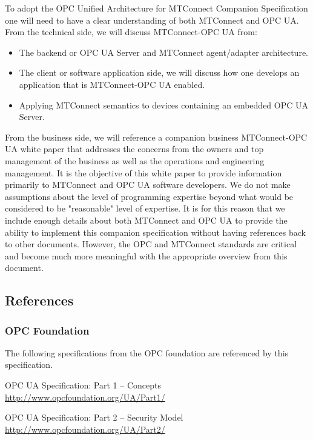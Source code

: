 \documentclass{mtconnect}	%
\begin{document}
To adopt the OPC Unified Architecture for MTConnect Companion Specification one will need to have a clear understanding of both MTConnect and OPC UA. From the technical side, we will discuss MTConnect-OPC UA from:

\begin{itemize}
    \item The backend or OPC UA Server and MTConnect agent/adapter architecture.
    \item The client or software application side, we will discuss how one develops an application that is MTConnect-OPC UA enabled.
    \item Applying MTConnect semantics to devices containing an embedded OPC UA Server.
\end{itemize}

From the business side, we will reference a companion business MTConnect-OPC UA white paper that addresses the concerns from the owners and top management of the business as well as the operations and engineering management. It is the objective of this white paper to provide information primarily to MTConnect and OPC UA software developers. We do not make assumptions about the level of programming expertise beyond what would be considered to be "reasonable" level of expertise. It is for this reason that we include enough details about both MTConnect and OPC UA to provide the ability to implement this companion specification without having references back to other documents. However, the OPC and MTConnect standards are critical and become much more meaningful with the appropriate overview from this document.

\subsection{References}

\subsubsection{OPC Foundation}

The following specifications from the OPC foundation are referenced by this specification.

\hang [UA Part 1]	OPC UA Specification: Part 1 -- Concepts \\
\url{http://www.opcfoundation.org/UA/Part1/}

\hang [UA Part 2]	OPC UA Specification: Part 2 -- Security Model \\
\url{http://www.opcfoundation.org/UA/Part2/}
\end{document}
